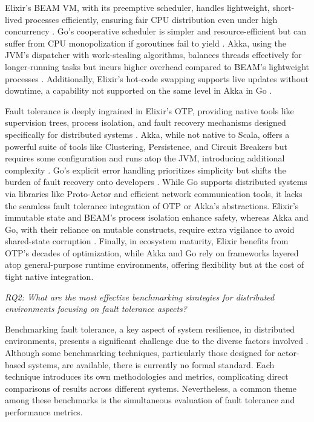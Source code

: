 Elixir’s BEAM VM, with its preemptive scheduler, handles lightweight, short-lived processes efficiently, ensuring fair CPU distribution even under high concurrency \cite{elixir-docs-hexdocs}. Go’s cooperative scheduler is simpler and resource-efficient but can suffer from CPU monopolization if goroutines fail to yield \cite{go-docs}. Akka, using the JVM’s dispatcher with work-stealing algorithms, balances threads effectively for longer-running tasks but incurs higher overhead compared to BEAM’s lightweight processes \cite{akka-docs}. Additionally, Elixir’s hot-code swapping supports live updates without downtime, a capability not supported on the same level in Akka in Go \cite{Juric2024}.

Fault tolerance is deeply ingrained in Elixir’s OTP, providing native tools like supervision trees, process isolation, and fault recovery mechanisms designed specifically for distributed systems \cite{elixir-docs-hexdocs}. Akka, while not native to Scala, offers a powerful suite of tools like Clustering, Persistence, and Circuit Breakers but requires some configuration and runs atop the JVM, introducing additional complexity \cite{akka-docs}. Go’s explicit error handling prioritizes simplicity but shifts the burden of fault recovery onto developers \cite{go-docs}. While Go supports distributed systems via libraries like Proto-Actor and efficient network communication tools, it lacks the seamless fault tolerance integration of OTP or Akka’s abstractions. Elixir’s immutable state and BEAM’s process isolation enhance safety, whereas Akka and Go, with their reliance on mutable constructs, require extra vigilance to avoid shared-state corruption \cite{go-docs,akka-docs}. Finally, in ecosystem maturity, Elixir benefits from OTP’s decades of optimization, while Akka and Go rely on frameworks layered atop general-purpose runtime environments, offering flexibility but at the cost of tight native integration.

\textit{RQ2: What are the most effective benchmarking strategies for distributed environments focusing on fault tolerance aspects?}

Benchmarking fault tolerance, a key aspect of system resilience, in distributed environments, presents a significant challenge due to the diverse factors involved \cite{Almeida2013,Blessing2019}. Although some benchmarking techniques, particularly those designed for actor-based systems, are available, there is currently no formal standard. Each technique introduces its own methodologies and metrics, complicating direct comparisons of results across different systems. Nevertheless, a common theme among these benchmarks is the simultaneous evaluation of fault tolerance and performance metrics.

